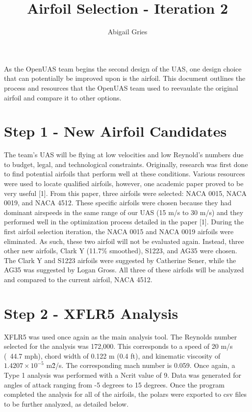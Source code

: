 \documentclass{article}
\begin{document}
\title{\textbf{Airfoil Selection - Iteration 2}}
\author{Abigail Gries}
\maketitle

As the OpenUAS team begins the second design of the UAS, one design choice that can potentially be improved upon is the airfoil. This document outlines the process and resources that the OpenUAS team used to reevaulate the original airfoil and compare it to other options. 

\section*{Step 1 - New Airfoil Candidates}

The team's UAS will be flying at low velocities and low Reynold's numbers due to budget, legal, and technological constraints. Originally, research was first done to find potential airfoils that perform well at these conditions. Various resources were used to locate qualified airfoils, however, one academic paper proved to be very useful [1]. From this paper, three airfoils were selected: NACA 0015, NACA 0019, and NACA 4512. These specific airfoils were chosen because they had dominant airspeeds in the same range of our UAS (15 m/s to 30 m/s) and they performed well in the optimization process detailed in the paper [1]. During the first airfoil selection iteration, the NACA 0015 and NACA 0019 airfoils were eliminated. As such, these two airfoil will not be evaluated again. Instead, three other new airfoils, Clark Y (11.7\% smoothed), S1223, and AG35 were chosen. The Clark Y and S1223 airfoils were suggested by Catherine Sener, while the AG35 was suggested by Logan Gross. All three of these airfoils will be analyzed and compared to the current airfoil, NACA 4512. 

\section*{Step 2 - XFLR5 Analysis}

XFLR5 was used once again as the main analysis tool. The Reynolds number selected for the analysis was 172,000. This corresponds to a speed of 20 m/s (~44.7 mph), chord width of 0.122 m (0.4 ft), and kinematic viscosity of $1.4207\times10^{-5}$ m\^2/s. The corresponding mach number is 0.059. Once again, a Type 1 analysis was performed with a Ncrit value of 9. Data was generated for angles of attack ranging from -5 degrees to 15 degrees. Once the program completed the analysis for all of the airfoils, the polars were exported to csv files to be further analyzed, as detailed below. 
\end{document}
